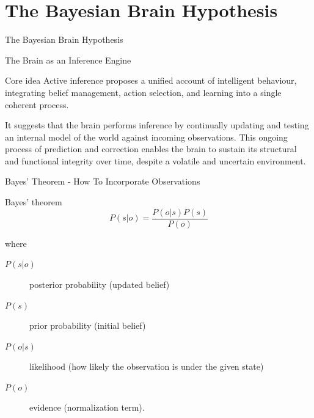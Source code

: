 \documentclass[aspectratio=1610, english]{beamer}
\begin{document}
\section{The Bayesian Brain Hypothesis}
\begin{frame}{The Bayesian Brain Hypothesis}
    \sectionpage
\end{frame}
\begin{frame}{The Brain as an Inference Engine}
    \begin{block}{Core idea}
        Active inference proposes a unified account of intelligent behaviour, integrating belief management, action selection, and learning into a single coherent process.
    \end{block}

  It suggests that the brain performs inference by continually updating and testing an internal model of the world against incoming observations.  
  This ongoing process of prediction and correction enables the brain to sustain its structural and functional integrity over time, despite a volatile and uncertain environment.
\end{frame}

\begin{frame}{Bayes' Theorem - How To Incorporate Observations}
    \begin{block}{Bayes' theorem}
        \begin{equation}
            P(s|o) = \frac{P(o|s)P(s)}{P(o)}
        \end{equation}
    \end{block}
    where
    \begin{description}
        \item[$P(s|o)$] posterior probability (updated belief)
        \item[$P(s)$] prior probability (initial belief)
        \item[$P(o|s)$] likelihood (how likely the observation is under the given state)
        \item[$P(o)$] evidence (normalization term).
    \end{description}
    
    \vspace{0.5cm}
    
    \centering
\end{frame}
\end{document}
